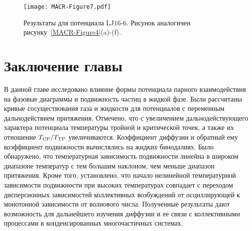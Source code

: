 \begin{figure}[!t]
  \centering
  \texttt{[image: MACR-Figure7.pdf]}
  \caption{Результаты для потенциала LJ$16$-$6$.
    Рисунок аналогичен рисунку~\ref{MACR-Figure4}(a)-(f).}
  \label{MACR-Figure7}
\end{figure}


\section{Заключение главы}
\label{MACR-SecConclusions}

В данной главе исследовано влияние формы потенциала парного взаимодействия на фазовые диаграммы и подвижность частиц в жидкой фазе.
Были рассчитаны кривые сосуществования газа и жидкости для потенциалов с переменным дальнодействием притяжения.
Отмечено, что с увеличением дальнодействующего характера потенциала температуры тройной и критической точек, а также их отношение $T_{\rm CP}/T_{\rm TP}$ увеличиваются.
Коэффициент диффузии и обратный ему коэффициент подвижности вычислялись на жидких бинодалиях.
Было обнаружено, что температурная зависимость подвижности линейна в широком диапазоне температур с тем большим наклоном, чем меньше диапазон притяжения.
Кроме того, установлено, что начало нелинейной температурной зависимости подвижности при высоких температурах совпадает с переходом дисперсионных зависимостей коллективных возбуждений от осциллирующей к монотонной зависимости от волнового числа.
Полученные результаты дают возможность для дальнейшего изучения диффузии и ее связи с коллективными процессами в конденсированных многочастичных системах.
